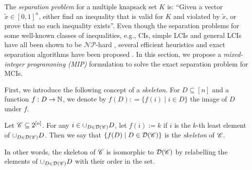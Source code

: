  The \emph{separation problem} for a multiple knapsack set $K$ is: ``Given a vector $\tilde x \in [0,1]^n$, either find an inequality that is valid for $K$ and violated by $\tilde x$, or prove that no such inequality exists''. 
Even though the separation problems for some well-known classes of inequalities, e.g., CIs, simple LCIs and general LCIs have all been shown to be $\mathcal{NP}$-hard \cite{ferreira1996solving,gu1999lifted,klabjan1998complexity}, several efficient heuristics and exact separation algorithms have been proposed \cite{crowder1983solving,gu1998lifted,wolsey1999integer,weismantel19970}. 
In this section, we propose a \emph{mixed-integer programming (MIP)} formulation to solve the exact separation problem for MCIs.

First, we introduce the following concept of a \emph{skeleton}.
For $D \subseteq [n]$ and a function $f: D \to \mathbb{N}$, we denote by $f(D): = \{f(i) \mid i \in D\}$ the image of $D$ under $f$. 
 \begin{definition}[Skeleton]
 Let $\mathscr{C} \subseteq 2^{[n]}$.
 For any $i \in \cup_{D \in \mathcal{D}(\mathscr{C})} D$, let $f(i) := k$ if $i$ is the $k$-th least element of $\cup_{D \in \mathcal{D}(\mathscr{C})} D$. 
 Then we say that $\{f(D) \mid D \in \mathcal{D}(\mathscr{C})\}$ is the \emph{skeleton} of $\mathscr{C}$.
 \end{definition}
In other words, the skeleton of $\mathscr{C}$ is isomorphic to $\mathcal{D}(\mathscr{C})$ by relabelling the elements of $\cup_{D \in \mathcal{D}(\mathscr{C})} D$ with their order in the set. 


